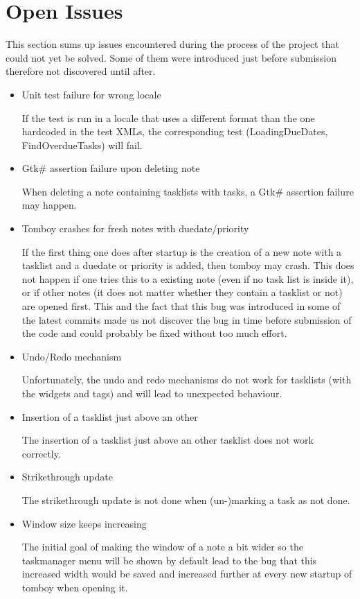 \section{Open Issues}
\label{issues}

This section sums up issues encountered during the process of the project that could not yet be solved.
Some of them were introduced just before submission therefore not discovered until after.

\begin{itemize}
\item Unit test failure for wrong locale

  If the test is run in a locale that uses a different format than the one hardcoded in the test XMLs, the corresponding test (LoadingDueDates, FindOverdueTasks) will fail.

\item Gtk# assertion failure upon deleting note

  When deleting a note containing tasklists with tasks, a Gtk# assertion failure may happen.

\item Tomboy crashes for fresh notes with duedate/priority

  If the first thing one does after startup is the creation of a new note with a tasklist and a duedate or priority is added, then tomboy may crash. This does not happen if one tries this to a existing note (even if no task list is inside it), or if other notes (it does not matter whether they contain a tasklist or not) are opened first. 
This and the fact that this bug was introduced in some of the latest commits made us not discover the bug in time before submission of the code and could probably be fixed without too much effort.

\item Undo/Redo mechanism

  Unfortunately, the undo and redo mechanisms do not work for tasklists (with the widgets and tags) and will lead to unexpected behaviour.

\item Insertion of a tasklist just above an other

  The insertion of a tasklist just above an other tasklist does not work correctly.

\item Strikethrough update
  
  The strikethrough update is not done when (un-)marking a task as not done.

\item Window size keeps increasing

  The initial goal of making the window of a note a bit wider so the taskmanager menu will be shown by default lead to the bug that this increased width would be saved and increased further at every new startup of tomboy when opening it.

\end{itemize}